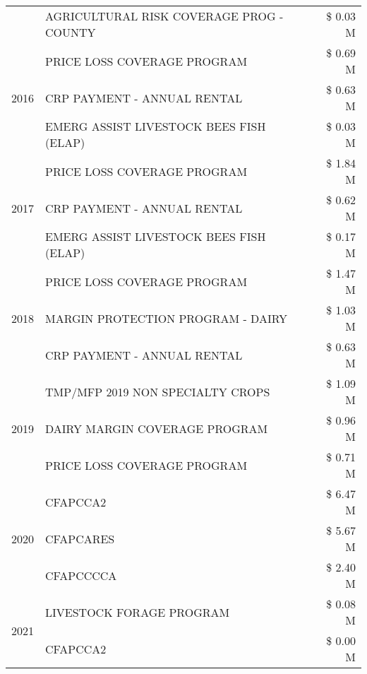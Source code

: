 \begin{tabular}{llr}
 & AGRICULTURAL RISK COVERAGE PROG - COUNTY & \$ 0.03 M \\
\cline{1-3}
\multirow[t]{3}{*}{2016} & PRICE LOSS COVERAGE PROGRAM & \$ 0.69 M \\
 & CRP PAYMENT - ANNUAL RENTAL & \$ 0.63 M \\
 & EMERG ASSIST LIVESTOCK BEES FISH (ELAP) & \$ 0.03 M \\
\cline{1-3}
\multirow[t]{3}{*}{2017} & PRICE LOSS COVERAGE PROGRAM & \$ 1.84 M \\
 & CRP PAYMENT - ANNUAL RENTAL & \$ 0.62 M \\
 & EMERG ASSIST LIVESTOCK BEES FISH (ELAP) & \$ 0.17 M \\
\cline{1-3}
\multirow[t]{3}{*}{2018} & PRICE LOSS COVERAGE PROGRAM & \$ 1.47 M \\
 & MARGIN PROTECTION PROGRAM - DAIRY & \$ 1.03 M \\
 & CRP PAYMENT - ANNUAL RENTAL & \$ 0.63 M \\
\cline{1-3}
\multirow[t]{3}{*}{2019} & TMP/MFP 2019 NON SPECIALTY CROPS & \$ 1.09 M \\
 & DAIRY MARGIN COVERAGE PROGRAM & \$ 0.96 M \\
 & PRICE LOSS COVERAGE PROGRAM & \$ 0.71 M \\
\cline{1-3}
\multirow[t]{3}{*}{2020} & CFAPCCA2 & \$ 6.47 M \\
 & CFAPCARES & \$ 5.67 M \\
 & CFAPCCCCA & \$ 2.40 M \\
\cline{1-3}
\multirow[t]{2}{*}{2021} & LIVESTOCK FORAGE PROGRAM & \$ 0.08 M \\
 & CFAPCCA2 & \$ 0.00 M \\
\cline{1-3}
\bottomrule
\end{tabular}
